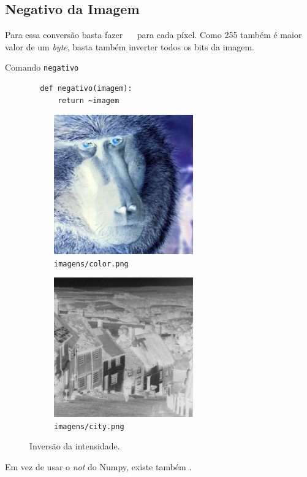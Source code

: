 \subsection{Negativo da Imagem}

Para essa conversão basta fazer ~~ para cada píxel. Como 255 também é maior valor de um \textit{byte}, basta também inverter todos os bits da imagem.

\begin{listing}[h]
    \caption{Comando \texttt{negativo}}

    \begin{verbatim}
        def negativo(imagem):
            return ~imagem
    \end{verbatim}
\end{listing}

\begin{figure}[h]
    \centering
    \begin{subfigure}{0.45\textwidth}
        \centering
        \includegraphics[width=6cm]{resultados/colorneg.png}
        \caption{\texttt{imagens/color.png}}
    \end{subfigure}%
    \begin{subfigure}{0.45\textwidth}
        \centering
        \includegraphics[width=6cm]{resultados/cityneg.png}
        \caption{\texttt{imagens/city.png}}
    \end{subfigure}

    \caption{Inversão da intensidade.}
\end{figure}

Em vez de usar o \textit{not} do Numpy, existe também  \autocite{ref:bitwise_not}.
